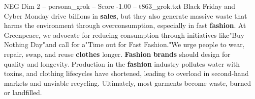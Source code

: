 \begin{textsample}{NEG Dim 2 – persona\_grok – Score -1.00 – t863\_grok.txt}  \label{ex:f2_neg_023}
Black Friday and Cyber Monday drive billions in \textbf{sales}, but they also generate massive waste that harms the environment through overconsumption, especially in fast \textbf{fashion}.
At Greenpeace, we advocate for reducing consumption through initiatives like"Buy Nothing Day"and call for a"Time out for Fast Fashion."We urge people to wear, repair, swap, and reuse \textbf{clothes} longer. \textbf{Fashion} \textbf{brands} should design for quality and longevity.
Production in the \textbf{fashion} industry pollutes water with toxins, and clothing lifecycles have shortened, leading to overload in second-hand markets and unviable recycling.
Ultimately, most garments become waste, burned or landfilled.

\end{textsample}
